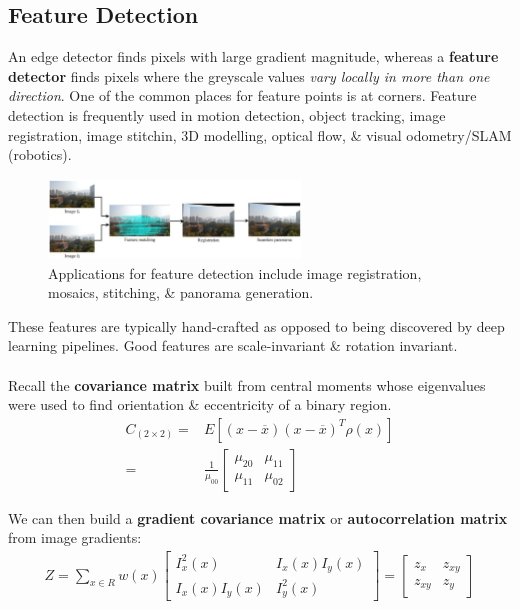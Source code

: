 \documentclass[a4paper,11pt]{article}
\begin{document}
\subsection{Feature Detection}
An edge detector finds pixels with large gradient magnitude, whereas a \textbf{feature detector} finds pixels where the greyscale values \textit{vary locally in more than one direction}.
One of the common places for feature points is at corners.
Feature detection is frequently used in motion detection, object tracking, image registration, image stitchin, 3D modelling, optical flow, \& visual odometry/SLAM (robotics).

\begin{figure}[H]
    \centering
    \includegraphics[width=0.6\textwidth]{images/panaroma.png}
    \caption{Applications for feature detection include image registration, mosaics, stitching, \& panorama generation.}
\end{figure}

These features are typically hand-crafted as opposed to being discovered by deep learning pipelines.
Good features are scale-invariant \& rotation invariant.
\\\\
Recall the \textbf{covariance matrix} built from central moments whose eigenvalues were used to find orientation \& eccentricity of a binary region.
\begin{align*}
    C_{(2 \times 2)}    =& E\left[ (x - \overline{x})(x - \overline{x})^T \rho(x) \right]\\
    =& \frac{1}{\mu_{00}}
    \begin{bmatrix}
        \mu_{20} & \mu_{11} \\
        \mu_{11} & \mu_{02} 
    \end{bmatrix}
\end{align*}

We can then build a \textbf{gradient covariance matrix} or \textbf{autocorrelation matrix} from image gradients:
\begin{align*}
    Z = \sum_{x \in R} w(x)
    \begin{bmatrix}
        I^2_x(x) & I_x(x)I_y(x) \\
        I_x(x)I_y(x) & I^2_y(x)
    \end{bmatrix}
    =
    \begin{bmatrix}
        z_x & z_{xy} \\
        z_{xy} & z_y
    \end{bmatrix}
\end{align*}
\end{document}
